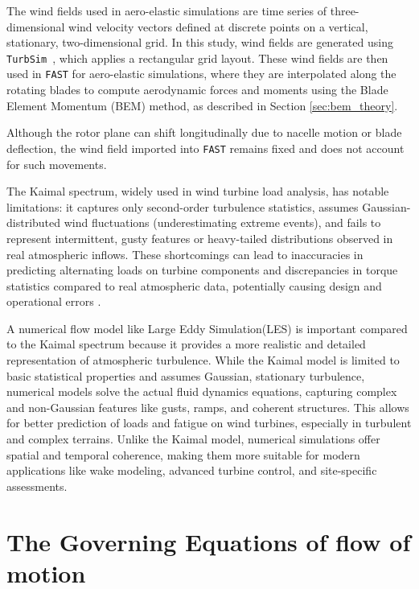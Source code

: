 The wind fields used in aero-elastic simulations are time series of three-dimensional wind velocity vectors defined at discrete points on a vertical, stationary, two-dimensional grid. In this study, wind fields are generated using \texttt{TurbSim}~\cite{turbsim09}, which applies a rectangular grid layout. These wind fields are then used in \texttt{FAST} for aero-elastic simulations, where they are interpolated along the rotating blades to compute aerodynamic forces and moments using the Blade Element Momentum (BEM) method, as described in Section \ref{sec:bem_theory}. 

Although the rotor plane can shift longitudinally due to nacelle motion or blade deflection, the wind field imported into \texttt{FAST} remains fixed and does not account for such movements.


The Kaimal spectrum, widely used in wind turbine load analysis, has notable limitations: it captures only second-order turbulence statistics, assumes Gaussian-distributed wind fluctuations (underestimating extreme events), and fails to represent intermittent, gusty features or heavy-tailed distributions observed in real atmospheric inflows. These shortcomings can lead to inaccuracies in predicting alternating loads on turbine components and discrepancies in torque statistics compared to real atmospheric data, potentially causing design and operational errors \cite{Mucke2011}.

A numerical flow model like Large Eddy Simulation(LES) is important compared to the Kaimal spectrum because it provides a more realistic and detailed representation of atmospheric turbulence. While the Kaimal model is limited to basic statistical properties and assumes Gaussian, stationary turbulence, numerical models solve the actual fluid dynamics equations, capturing complex and non-Gaussian features like gusts, ramps, and coherent structures. This allows for better prediction of loads and fatigue on wind turbines, especially in turbulent and complex terrains. Unlike the Kaimal model, numerical simulations offer spatial and temporal coherence, making them more suitable for modern applications like wake modeling, advanced turbine control, and site-specific assessments. \cite{Doubrawa2019}


\section{The Governing Equations of flow of motion}
